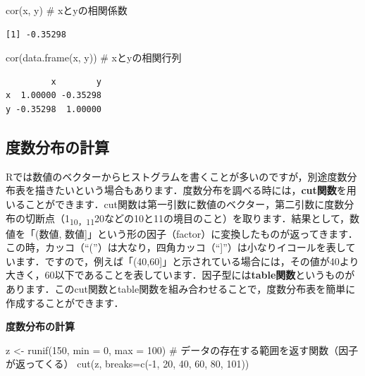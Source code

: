 \documentclass[
  letterpaper,
  DIV=11,
  numbers=noendperiod]{scrreprt}
\newenvironment{Shaded}{\begin{snugshade}}{\end{snugshade}}
\newcommand{\AttributeTok}[1]{\textcolor[rgb]{0.40,0.45,0.13}{#1}}
\newcommand{\CommentTok}[1]{\textcolor[rgb]{0.37,0.37,0.37}{#1}}
\newcommand{\DecValTok}[1]{\textcolor[rgb]{0.68,0.00,0.00}{#1}}
\newcommand{\FunctionTok}[1]{\textcolor[rgb]{0.28,0.35,0.67}{#1}}
\newcommand{\NormalTok}[1]{\textcolor[rgb]{0.00,0.23,0.31}{#1}}
\newcommand{\OtherTok}[1]{\textcolor[rgb]{0.00,0.23,0.31}{#1}}
\newcommand{\SpecialCharTok}[1]{\textcolor[rgb]{0.37,0.37,0.37}{#1}}
\begin{document}
\begin{Shaded}
\begin{Highlighting}[]
\FunctionTok{cor}\NormalTok{(x, y) }\CommentTok{\# xとyの相関係数}
\end{Highlighting}
\end{Shaded}

\begin{verbatim}
[1] -0.35298
\end{verbatim}

\begin{Shaded}
\begin{Highlighting}[]
\FunctionTok{cor}\NormalTok{(}\FunctionTok{data.frame}\NormalTok{(x, y)) }\CommentTok{\# xとyの相関行列}
\end{Highlighting}
\end{Shaded}

\begin{verbatim}
         x        y
x  1.00000 -0.35298
y -0.35298  1.00000
\end{verbatim}

\hypertarget{ux5ea6ux6570ux5206ux5e03ux306eux8a08ux7b97}{%
\subsection{度数分布の計算}\label{ux5ea6ux6570ux5206ux5e03ux306eux8a08ux7b97}}

Rでは数値のベクターからヒストグラムを書くことが多いのですが，別途度数分布表を描きたいという場合もあります．度数分布を調べる時には，\textbf{cut関数}を用いることができます．cut関数は第一引数に数値のベクター，第二引数に度数分布の切断点（1\textsubscript{10，11}20などの10と11の境目のこと）を取ります．結果として，数値を「(数値,
数値{]}」という形の因子（factor）に変換したものが返ってきます．この時，カッコ（``(''）は大なり，四角カッコ（``{]}''）は小なりイコールを表しています．ですので，例えば「(40,60{]}」と示されている場合には，その値が40より大きく，60以下であることを表しています．因子型には\textbf{table関数}というものがあります．このcut関数とtable関数を組み合わせることで，度数分布表を簡単に作成することができます．

\textbf{度数分布の計算}

\begin{Shaded}
\begin{Highlighting}[]
\NormalTok{z }\OtherTok{\textless{}{-}} \FunctionTok{runif}\NormalTok{(}\DecValTok{150}\NormalTok{, }\AttributeTok{min =} \DecValTok{0}\NormalTok{, }\AttributeTok{max =} \DecValTok{100}\NormalTok{)}
\CommentTok{\# データの存在する範囲を返す関数（因子が返ってくる）}
\FunctionTok{cut}\NormalTok{(z, }\AttributeTok{breaks=}\FunctionTok{c}\NormalTok{(}\SpecialCharTok{{-}}\DecValTok{1}\NormalTok{, }\DecValTok{20}\NormalTok{, }\DecValTok{40}\NormalTok{, }\DecValTok{60}\NormalTok{, }\DecValTok{80}\NormalTok{, }\DecValTok{101}\NormalTok{)) }
\end{Highlighting}
\end{Shaded}
\end{document}
